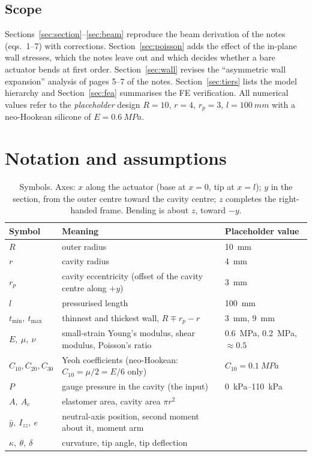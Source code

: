 \documentclass[11pt,a4paper]{article}
\numberwithin{equation}{section}
\newcommand{\Izz}{I_{zz}}
\newcommand{\rp}{r_p}
\newcommand{\tmin}{t_{\min}}
\newcommand{\tmax}{t_{\max}}
\begin{document}
\subsection{Scope}
Sections~\ref{sec:section}--\ref{sec:beam} reproduce the beam derivation of the notes (eqs.~1--7) with
corrections. Section~\ref{sec:poisson} adds the effect of the in-plane wall stresses, which the notes
leave out and which decides whether a bare actuator bends at first order. Section~\ref{sec:wall} revises the
``asymmetric wall expansion'' analysis of pages 5--7 of the notes. Section~\ref{sec:tiers} lists the model hierarchy and
Section~\ref{sec:fea} summarises the FE verification. All numerical values refer to the
\emph{placeholder} design $R=10$, $r=4$, $\rp=3$, $l=\SI{100}{mm}$ with a neo-Hookean silicone of $E=\SI{0.6}{MPa}$.

\section{Notation and assumptions}

\begin{table}[H]
\centering\small
\begin{tabular}{@{}lll@{}}
\toprule
Symbol & Meaning & Placeholder value \\
\midrule
$R$ & outer radius & \SI{10}{mm}\\
$r$ & cavity radius & \SI{4}{mm}\\
$\rp$ & cavity eccentricity (offset of the cavity centre along $+y$) & \SI{3}{mm}\\
$l$ & pressurised length & \SI{100}{mm}\\
$\tmin,\ \tmax$ & thinnest and thickest wall, $R\mp\rp-r$ & \SI{3}{mm}, \SI{9}{mm}\\
$E,\ \mu,\ \nu$ & small-strain Young's modulus, shear modulus, Poisson's ratio & \SI{0.6}{MPa}, \SI{0.2}{MPa}, $\approx 0.5$\\
$C_{10},C_{20},C_{30}$ & Yeoh coefficients (neo-Hookean: $C_{10}=\mu/2=E/6$ only) & $C_{10}=\SI{0.1}{MPa}$\\
$P$ & gauge pressure in the cavity (the input) & \SIrange{0}{110}{kPa}\\
$A,\ A_c$ & elastomer area, cavity area $\pi r^2$ & \\
$\bar y,\ \Izz,\ e$ & neutral-axis position, second moment about it, moment arm & \\
$\kappa,\ \theta,\ \delta$ & curvature, tip angle, tip deflection & \\
\bottomrule
\end{tabular}
\caption{Symbols. Axes: $x$ along the actuator (base at $x=0$, tip at $x=l$); $y$ in the section, from the
outer centre toward the cavity centre; $z$ completes the right-handed frame. Bending is about $z$, toward $-y$.}
\end{table}
\end{document}
